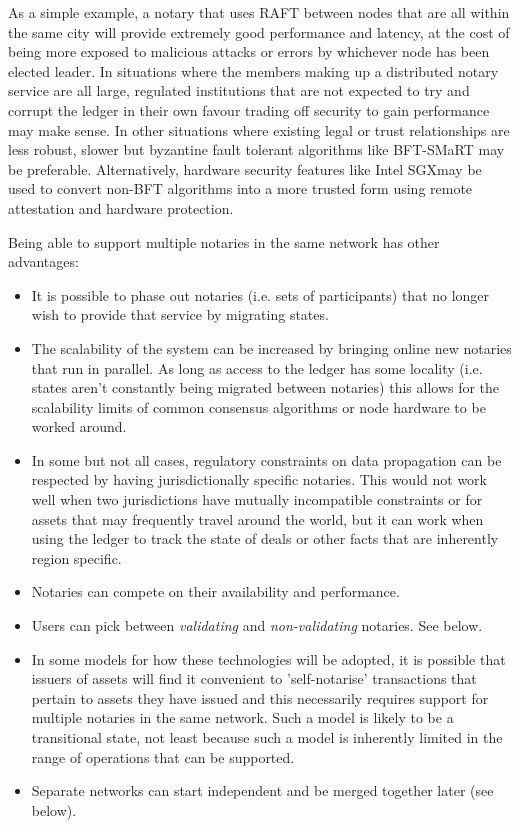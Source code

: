 \documentclass{article}
\begin{document}
As a simple example, a notary that uses RAFT between nodes that are all within the same city will provide extremely good
performance and latency, at the cost of being more exposed to malicious attacks or errors by whichever node has been elected
leader. In situations where the members making up a distributed notary service are all large, regulated institutions that
are not expected to try and corrupt the ledger in their own favour trading off security to gain performance may make sense.
In other situations where existing legal or trust relationships are less robust, slower but byzantine fault tolerant
algorithms like BFT-SMaRT\cite{Bessani:2014:SMR:2671853.2672428} may be preferable. Alternatively, hardware security features
like Intel SGX\textregistered may be used to convert non-BFT algorithms into a more trusted form using remote attestation and
hardware protection.

Being able to support multiple notaries in the same network has other advantages:

\begin{itemize}
\item It is possible to phase out notaries (i.e. sets of participants) that no longer wish to provide that service by
migrating states.
\item The scalability of the system can be increased by bringing online new notaries that run in parallel. As long as access
to the ledger has some locality (i.e. states aren't constantly being migrated between notaries) this allows for the scalability
limits of common consensus algorithms or node hardware to be worked around.
\item In some but not all cases, regulatory constraints on data propagation can be respected by having jurisdictionally
specific notaries. This would not work well when two jurisdictions have mutually incompatible constraints or for assets that
may frequently travel around the world, but it can work when using the ledger to track the state of deals or other facts that
are inherently region specific.
\item Notaries can compete on their availability and performance.
\item Users can pick between \emph{validating} and \emph{non-validating} notaries. See below.
\item In some models for how these technologies will be adopted, it is possible that issuers of assets will find it
convenient to 'self-notarise' transactions that pertain to assets they have issued and this necessarily requires
support for multiple notaries in the same network. Such a model is likely to be a transitional state, not least
because such a model is inherently limited in the range of operations that can be supported.
\item Separate networks can start independent and be merged together later (see below).
\end{itemize}
\end{document}
